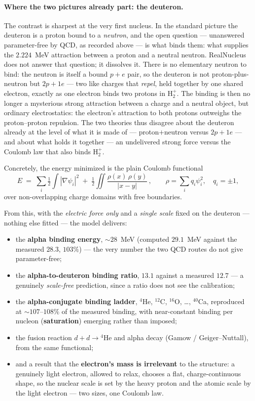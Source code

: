 \documentclass[11pt]{article}
\begin{document}
\paragraph{Where the two pictures already part: the deuteron.} The contrast is sharpest at the very
first nucleus. In the standard picture the deuteron is a proton bound to a \emph{neutron}, and the open
question --- unanswered parameter-free by QCD, as recorded above --- is what binds them: what supplies
the $2.224$~MeV attraction between a proton and a neutral neutron. RealNucleus does not answer that
question; it dissolves it. There is no elementary neutron to bind: the neutron is itself a bound
$p+e$ pair, so the deuteron is not proton-plus-neutron but $2p+1e$ --- two like charges that
\emph{repel}, held together by one shared electron, exactly as one electron binds two protons in
$\mathrm{H}_2^+$. The binding is then no longer a mysterious strong attraction between a charge and a
neutral object, but ordinary electrostatics: the electron's attraction to both protons outweighs the
proton--proton repulsion. The two theories thus disagree about the deuteron already at the level of what
it is made of --- proton$+$neutron versus $2p+1e$ --- and about what holds it together --- an
undelivered strong force versus the Coulomb law that also binds $\mathrm{H}_2^+$.

Concretely, the energy minimized is the plain Coulomb functional
\[
  E \;=\; \sum_i \tfrac12\!\int |\nabla \psi_i|^2
        \;+\; \tfrac12\!\iint \frac{\rho(x)\,\rho(y)}{|x-y|}\,,
  \qquad \rho = \sum_i q_i \psi_i^2,\quad q_i = \pm 1,
\]
over non-overlapping charge domains with free boundaries.

From this, with the \emph{electric force only} and a \emph{single scale} fixed on the deuteron ---
nothing else fitted --- the model delivers:
\begin{itemize}
\item the \textbf{alpha binding energy}, $\sim 28$~MeV (computed $29.1$~MeV against the measured $28.3$,
  $103\%$) --- the very number the two QCD routes do not give parameter-free;
\item the \textbf{alpha-to-deuteron binding ratio}, $13.1$ against a measured $12.7$ --- a genuinely
  \emph{scale-free} prediction, since a ratio does not see the calibration;
\item the \textbf{alpha-conjugate binding ladder}, ${}^4$He, ${}^{12}$C, ${}^{16}$O, \dots, ${}^{40}$Ca,
  reproduced at $\sim 107$--$108\%$ of the measured binding, with near-constant binding per nucleon
  (\textbf{saturation}) emerging rather than imposed;
\item the fusion reaction $d+d\to{}^4$He and alpha decay (Gamow / Geiger--Nuttall), from the same
  functional;
\item and a result that the \textbf{electron's mass is irrelevant} to the structure: a genuinely light
  electron, allowed to relax, chooses a flat, charge-continuous shape, so the nuclear scale is set by the
  heavy proton and the atomic scale by the light electron --- two sizes, one Coulomb law.
\end{itemize}
\end{document}
